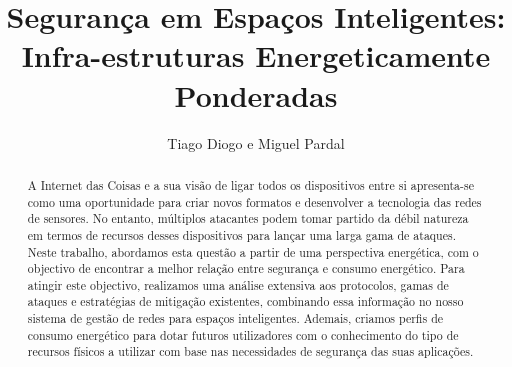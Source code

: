 \documentclass{llncs}
\begin{document}
\title{Segurança em Espaços Inteligentes: Infra-estruturas Energeticamente Ponderadas}
%
%
\author{Tiago Diogo e Miguel Pardal}
%
%
%

\maketitle              %

\begin{abstract}
A Internet das Coisas e a sua visão de ligar todos os dispositivos entre si apresenta-se como uma oportunidade para criar novos formatos e desenvolver a tecnologia das redes de sensores. No entanto, múltiplos atacantes podem tomar partido da débil natureza em termos de recursos desses dispositivos para lançar uma larga gama de ataques. Neste trabalho, abordamos esta questão a partir de uma perspectiva energética, com o objectivo de encontrar a melhor relação entre segurança e consumo energético. Para atingir este objectivo, realizamos uma análise extensiva aos protocolos, gamas de ataques e estratégias de mitigação existentes, combinando essa informação no nosso sistema de gestão de redes para espaços inteligentes. Ademais, criamos perfis de consumo energético para dotar futuros utilizadores com o conhecimento do tipo de recursos físicos a utilizar com base nas necessidades de segurança das suas aplicações.
\end{abstract}
\end{document}
